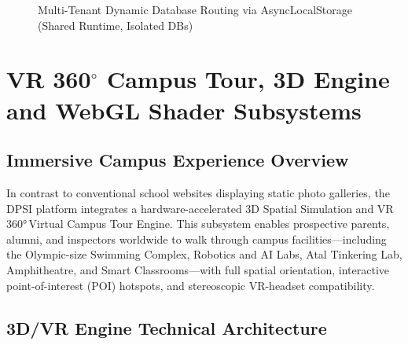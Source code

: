 \documentclass[12pt, a4paper, oneside]{report}
\def\textbf#1{#1}
\def\&{and}
\begin{document}
\begin{figure}[H]
\caption{Multi-Tenant Dynamic Database Routing via AsyncLocalStorage (Shared Runtime, Isolated DBs)}
\label{fig:multi-tenant-diagram}
\end{figure}


\chapter{VR \texorpdfstring{360$^\circ$}{360-Degree} Campus Tour, 3D Engine \texorpdfstring{\&}{and} WebGL Shader Subsystems}

\section{Immersive Campus Experience Overview}

In contrast to conventional school websites displaying static photo galleries,
the DPSI platform integrates a hardware-accelerated \textbf{3D Spatial
Simulation \& VR 360°\,Virtual Campus Tour Engine}.  This subsystem enables
prospective parents, alumni, and inspectors worldwide to walk through campus
facilities---including the Olympic-size Swimming Complex, Robotics \& AI Labs,
Atal Tinkering Lab, Amphitheatre, and Smart Classrooms---with full spatial
orientation, interactive point-of-interest (POI) hotspots, and stereoscopic
VR-headset compatibility.

\section{3D/VR Engine Technical Architecture}
\end{document}
